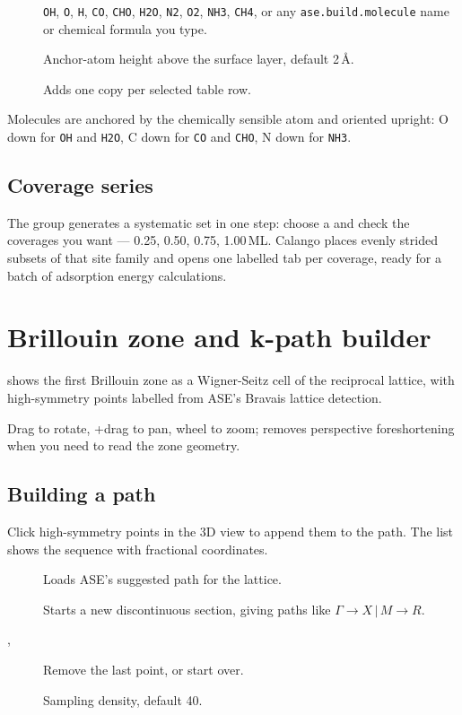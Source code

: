\begin{description}
  \item[] \texttt{OH}, \texttt{O}, \texttt{H}, \texttt{CO},
    \texttt{CHO}, \texttt{H2O}, \texttt{N2}, \texttt{O2}, \texttt{NH3},
    \texttt{CH4}, or any \texttt{ase.build.molecule} name or chemical
    formula you type.
  \item[] Anchor-atom height above the surface layer, default
    2\,\AA.
  \item[] Adds one copy per selected table row.
\end{description}

Molecules are anchored by the chemically sensible atom and oriented
upright: O down for \texttt{OH} and \texttt{H2O}, C down for \texttt{CO}
and \texttt{CHO}, N down for \texttt{NH3}.

\subsection{Coverage series}

The  group generates a systematic set in one step:
choose a  and check the coverages you want --- 0.25, 0.50,
0.75, 1.00\,ML. Calango places evenly strided subsets of that site family
and opens one labelled tab per coverage, ready for a batch of adsorption
energy calculations.

\section{Brillouin zone and k-path builder}
\label{sec:bz}

\menusep{} shows the first
Brillouin zone as a Wigner-Seitz cell of the reciprocal lattice, with
high-symmetry points labelled from ASE's Bravais lattice detection.

Drag to rotate, +drag to pan, wheel to zoom;
 removes perspective foreshortening when you
need to read the zone geometry.

\subsection{Building a path}

Click high-symmetry points in the 3D view to append them to the path. The
list shows the sequence with fractional coordinates.

\begin{description}
  \item[] Loads ASE's suggested path for the lattice.
  \item[] Starts a new discontinuous section, giving paths like
    $\Gamma \rightarrow X \,|\, M \rightarrow R$.
  \item[, ] Remove the last point, or start over.
  \item[] Sampling density, default 40.
\end{description}

